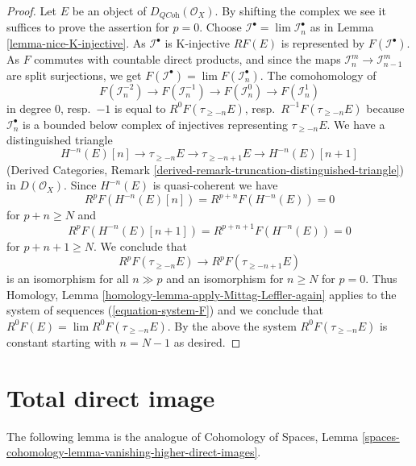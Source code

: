 \begin{proof}
Let $E$ be an object of $D_{\textit{QCoh}}(\mathcal{O}_X)$.
By shifting the complex we see it suffices to prove the assertion
for $p = 0$. Choose $\mathcal{I}^\bullet = \lim \mathcal{I}_n^\bullet$
as in Lemma \ref{lemma-nice-K-injective}.
As $\mathcal{I}^\bullet$ is K-injective $RF(E)$ is represented by
$F(\mathcal{I}^\bullet)$. As $F$ commutes with countable direct
products, and since the maps $\mathcal{I}_n^m \to \mathcal{I}_{n - 1}^m$
are split surjections, we get
$F(\mathcal{I}^\bullet) = \lim F(\mathcal{I}_n^\bullet)$.
The comohomology of
\begin{equation}
\label{equation-system-F}
F(\mathcal{I}_n^{-2}) \to
F(\mathcal{I}_n^{-1}) \to
F(\mathcal{I}_n^0) \to
F(\mathcal{I}_n^1)
\end{equation}
in degree $0$, resp.\ $-1$ is equal to $R^0F(\tau_{\geq -n}E)$,
resp.\ $R^{-1}F(\tau_{\geq -n}E)$ because $\mathcal{I}_n^\bullet$
is a bounded below complex of injectives representing $\tau_{\geq -n}E$.
We have a distinguished triangle
$$
H^{-n}(E)[n] \to \tau_{\geq -n}E \to \tau_{\geq - n + 1}E \to H^{-n}(E)[n + 1]
$$
(Derived Categories, Remark
\ref{derived-remark-truncation-distinguished-triangle})
in $D(\mathcal{O}_X)$. Since $H^{-n}(E)$ is quasi-coherent we have
$$
R^pF(H^{-n}(E)[n]) = R^{p + n}F(H^{-n}(E)) = 0
$$
for $p + n \geq N$ and
$$
R^pF(H^{-n}(E)[n + 1]) = R^{p + n + 1}F(H^{-n}(E)) = 0
$$
for $p + n + 1 \geq N$. We conclude that
$$
R^pF(\tau_{\geq -n}E) \to R^pF(\tau_{\geq - n + 1}E)
$$
is an isomorphism for all $n \gg p$ and an isomorphism for
$n \geq N$ for $p = 0$. Thus
Homology, Lemma \ref{homology-lemma-apply-Mittag-Leffler-again}
applies to the system of sequences (\ref{equation-system-F})
and we conclude that $R^0F(E) = \lim R^0F(\tau_{\geq - n}E)$.
By the above the system $R^0F(\tau_{\geq - n}E)$ is constant starting
with $n = N - 1$ as desired.
\end{proof}









\section{Total direct image}
\label{section-total-direct-image}

\noindent
The following lemma is the analogue of
Cohomology of Spaces, Lemma
\ref{spaces-cohomology-lemma-vanishing-higher-direct-images}.

